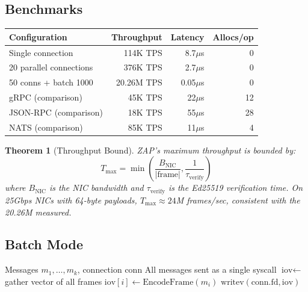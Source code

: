 \documentclass[11pt,letterpaper]{article}
\newtheorem{theorem}{Theorem}
\begin{document}
\subsection{Benchmarks}

\begin{table}[h]
\centering
\begin{tabular}{lrrr}
\toprule
\textbf{Configuration} & \textbf{Throughput} & \textbf{Latency} & \textbf{Allocs/op} \\
\midrule
Single connection & 114K TPS & 8.7$\mu$s & 0 \\
20 parallel connections & 376K TPS & 2.7$\mu$s & 0 \\
50 conns + batch 1000 & 20.26M TPS & 0.05$\mu$s & 0 \\
\midrule
gRPC (comparison) & 45K TPS & 22$\mu$s & 12 \\
JSON-RPC (comparison) & 18K TPS & 55$\mu$s & 28 \\
NATS (comparison) & 85K TPS & 11$\mu$s & 4 \\
\bottomrule
\end{tabular}
\end{table}

\begin{theorem}[Throughput Bound]
ZAP's maximum throughput is bounded by:
\[
T_{\max} = \min\left(\frac{B_{\text{NIC}}}{|\text{frame}|}, \frac{1}{\tau_{\text{verify}}}\right)
\]
where $B_{\text{NIC}}$ is the NIC bandwidth and $\tau_{\text{verify}}$ is the Ed25519 verification time. On 25Gbps NICs with 64-byte payloads, $T_{\max} \approx 24$M frames/sec, consistent with the 20.26M measured.
\end{theorem}

\subsection{Batch Mode}

\begin{algorithm}
\caption{ZAP Batch Send}
\begin{algorithmic}[1]
\REQUIRE Messages $m_1, \ldots, m_k$, connection $\text{conn}$
\ENSURE All messages sent as a single syscall
\STATE $\text{iov} \leftarrow$ gather vector of all frames
    \STATE $\text{iov}[i] \leftarrow \text{EncodeFrame}(m_i)$ 
\ENDFOR
\STATE $\text{writev}(\text{conn.fd}, \text{iov})$ 
\end{algorithmic}
\end{algorithm}
\end{document}
